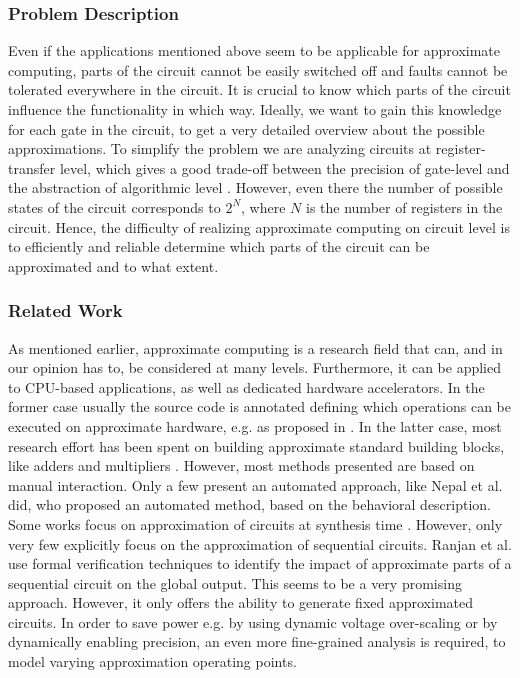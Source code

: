\documentclass[conference]{IEEEtran}
\begin{document}
\subsubsection*{Problem Description}
Even if the applications mentioned above seem to be applicable for approximate computing, parts of the circuit cannot be easily switched off and faults cannot be tolerated everywhere in the circuit. It is crucial to know which parts of the circuit influence the functionality in which way. Ideally, we want to gain this knowledge for each gate in the circuit, to get a very detailed overview about the possible approximations. To simplify the problem we are analyzing circuits at register-transfer level, which gives a good trade-off between the precision of gate-level and the abstraction of algorithmic level \cite{herkersdorf2014resilience}. However, even there the number of possible states of the circuit corresponds to $2^N$, where $N$ is the number of registers in the circuit. Hence, the difficulty of realizing approximate computing on circuit level is to efficiently and reliable determine which parts of the circuit can be approximated and to what extent.
\subsubsection*{Related Work}
As mentioned earlier, approximate computing is a research field that can, and in our opinion has to, be considered at many levels. Furthermore, it can be applied to CPU-based applications, as well as dedicated hardware accelerators. In the former case usually the source code is annotated defining which operations can be executed on approximate hardware, e.g. as proposed in \cite{sampson_enerj:_2011}. In the latter case, most research effort has been spent on building approximate standard building blocks, like adders and multipliers \cite{huang_exploring_2011,chakrapani_highly_2008,gupta_impact:_2011,kahng_accuracy-configurable_2012}. However, most methods presented are based on manual interaction. Only a few present an automated approach, like Nepal et al. \cite{nepal_abacus:_2014} did, who proposed an automated method, based on the behavioral description. Some works focus on approximation of circuits at synthesis time \cite{miao_approximate_2013,shin_approximate_2010,choudhury_approximate_2008}. However, only very few explicitly focus on the approximation of sequential circuits. Ranjan et al. \cite{ranjan_aslan:_2014} use formal verification techniques to identify the impact of approximate parts of a sequential circuit on the global output. This seems to be a very promising approach. However, it only offers the ability to generate fixed approximated circuits. In order to save power e.g. by using dynamic voltage over-scaling or by dynamically enabling precision, an even more fine-grained analysis is required, to model varying approximation operating points.
\end{document}
